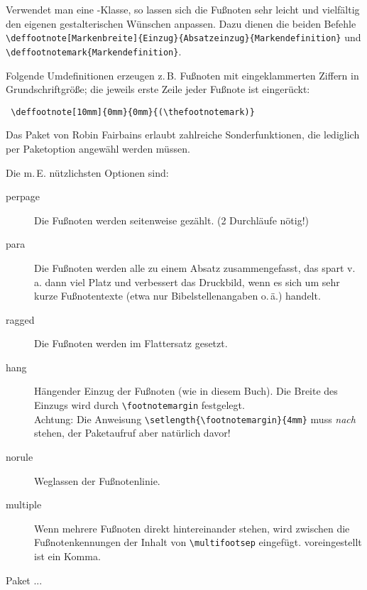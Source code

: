 Verwendet man eine \KOMAScript -Klasse, so lassen sich die Fußnoten sehr leicht und vielfältig
den eigenen gestalterischen Wünschen anpassen. Dazu dienen die beiden Befehle
\lstinline/\deffootnote[Markenbreite]{Einzug}{Absatzeinzug}{Markendefinition}/
und 
\lstinline/\deffootnotemark{Markendefinition}/.

Folgende Umdefinitionen erzeugen z.\,B. Fußnoten mit eingeklammerten Ziffern 
in Grundschriftgröße; die jeweils erste Zeile jeder Fußnote ist eingerückt:

\begin{lstlisting}
 \deffootnote[10mm]{0mm}{0mm}{(\thefootnotemark)}
\end{lstlisting}



Das Paket  von Robin Fairbains erlaubt zahlreiche Sonderfunktionen, die 
lediglich per Paketoption angewähl werden müssen.

Die m.\,E. nützlichsten Optionen sind:

\begin{description}
 \item[perpage] Die Fußnoten werden seitenweise gezählt. (2 Durchläufe nötig!)
 \item[para] Die Fußnoten werden alle zu einem Absatz zusammengefasst, das spart v.\,a. dann
  viel Platz und verbessert das Druckbild, wenn es sich um sehr kurze Fußnotentexte (etwa nur
  Bibelstellenangaben o.\,ä.) handelt.
 \item[ragged] Die Fußnoten werden im Flattersatz gesetzt.
 \item[hang] Hängender Einzug der Fußnoten (wie in diesem Buch).
  Die Breite des Einzugs wird durch \lstinline/\footnotemargin/ festgelegt.\\
  Achtung: Die Anweisung \lstinline/\setlength{\footnotemargin}{4mm}/ muss \emph{nach}
  \lstinline// stehen, der Paketaufruf aber natürlich davor!
 \item[norule] Weglassen der Fußnotenlinie.
 \item[multiple] Wenn mehrere Fußnoten direkt hintereinander stehen, wird zwischen die
  Fußnotenkennungen der Inhalt von \lstinline/\multifootsep/ eingefügt. voreingestellt ist
  ein Komma.
\end{description}




Paket ...



